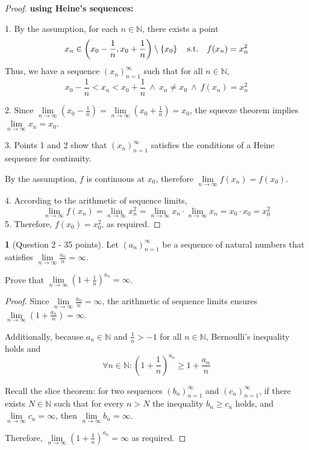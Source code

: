\documentclass[english]{article}
\theoremstyle{definition}
\newtheorem*{problem*}{\protect\problemname}
\newcommand{\limi}{\underset{n\rightarrow\infty}{\lim}}
\providecommand{\problemname}{Problem}
\begin{document}
\newpage{}
\begin{proof}
\textbf{using Heine's sequences:}\medskip{}

1. By the assumption, for each $n\in\mathbb{N}$, there exists a point
\[
x_{n}\in\left(x_{0}-\frac{1}{n},x_{0}+\frac{1}{n}\right)\setminus\left\{ x_{0}\right\} \quad\text{s.t.\ensuremath{\quad}}f(x_{n})=x_{n}^{2}
\]
Thus, we have a sequence $\left(x_{n}\right)_{n=1}^{\infty}$ such
that for all $n\in\mathbb{N},$ 
\[
x_{0}-\frac{1}{n}<x_{n}<x_{0}+\frac{1}{n}\ \wedge\ x_{n}\ne x_{0}\ \wedge\ f(x_{n})=x_{n}^{2}
\]

2. Since $\underset{n\rightarrow\infty}{\lim}\left(x_{0}-\frac{1}{n}\right)=\underset{n\rightarrow\infty}{\lim}\left(x_{0}+\frac{1}{n}\right)=x_{0}$,
the squeeze theorem implies $\underset{n\rightarrow\infty}{\lim}x_{n}=x_{0}$.

3. Points 1 and 2 show that $\left(x_{n}\right)_{n=1}^{\infty}$ satisfies
the conditions of a Heine sequence for continuity.

By the assumption, $f$ is continuous at $x_{0}$, therefore $\underset{n\rightarrow\infty}{\lim}f(x_{n})=f(x_{0})$.

4. According to the arithmetic of sequence limits,
\[
\underset{n\rightarrow\infty}{\lim}f(x_{n})=\underset{n\rightarrow\infty}{\lim}x_{n}^{2}=\underset{n\rightarrow\infty}{\lim}x_{n}\cdot\underset{n\rightarrow\infty}{\lim}x_{n}=x_{0}\cdot x_{0}=x_{0}^{2}
\]
 5. Therefore, $f(x_{0})=x_{0}^{2}$, as required. 
\end{proof}
\medskip{}

\begin{problem*}[Question 2 - 35 points]
 Let $(a_{n})_{n=1}^{\infty}$ be a sequence of natural numbers that
satisfies $\limi\frac{a_{n}}{n}=\infty$.
\end{problem*}
Prove that $\limi\left(1+\frac{1}{n}\right)^{a_{n}}=\infty$.
\begin{proof}
Since $\limi\frac{a_{n}}{n}=\infty$, the arithmetic of sequence limits
ensures $\limi\left(1+\frac{a_{n}}{n}\right)=\infty$.

Additionally, because $a_{n}\in\mathbb{N}$ and $\frac{1}{n}>-1$
for all $n\in\mathbb{N}$, Bernoulli's inequality holds and 
\[
\forall n\in\mathbb{N}:\left(1+\frac{1}{n}\right)^{a_{n}}\ge1+\frac{a_{n}}{n}
\]

Recall the slice theorem: for two sequences $(b_{n})_{n=1}^{\infty}$
and $(c_{n})_{n=1}^{\infty}$, if there exists $N\in\mathbb{N}$ such
that for every $n>N$ the inequality $b_{n}\ge c_{n}$ holds, and
$\limi c_{n}=\infty$, then $\limi b_{n}=\infty$. 

Therefore, $\limi\left(1+\frac{1}{n}\right)^{a_{n}}=\infty$ as required. 
\end{proof}
\end{document}
